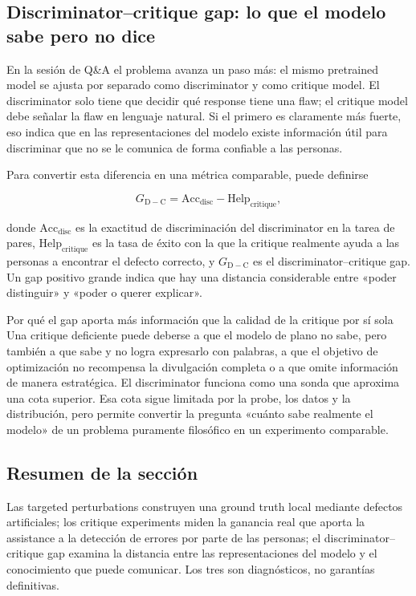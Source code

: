 \documentclass[a4paper]{article}
\begin{document}
\subsection{Discriminator--critique gap: lo que el modelo sabe pero no dice}

En la sesión de Q\&A el problema avanza un paso más: el mismo pretrained model se ajusta por separado como discriminator y como critique model. El discriminator solo tiene que decidir qué response tiene una flaw; el critique model debe señalar la flaw en lenguaje natural. Si el primero es claramente más fuerte, eso indica que en las representaciones del modelo existe información útil para discriminar que no se le comunica de forma confiable a las personas.

Para convertir esta diferencia en una métrica comparable, puede definirse

\[
G_{\mathrm{D-C}}=\mathrm{Acc}_{\mathrm{disc}}-\mathrm{Help}_{\mathrm{critique}},
\]

donde $\mathrm{Acc}_{\mathrm{disc}}$ es la exactitud de discriminación del discriminator en la tarea de pares, $\mathrm{Help}_{\mathrm{critique}}$ es la tasa de éxito con la que la critique realmente ayuda a las personas a encontrar el defecto correcto, y $G_{\mathrm{D-C}}$ es el discriminator--critique gap. Un gap positivo grande indica que hay una distancia considerable entre «poder distinguir» y «poder o querer explicar».

\begin{importantbox}{Por qué el gap aporta más información que la calidad de la critique por sí sola}
Una critique deficiente puede deberse a que el modelo de plano no sabe, pero también a que sabe y no logra expresarlo con palabras, a que el objetivo de optimización no recompensa la divulgación completa o a que omite información de manera estratégica. El discriminator funciona como una sonda que aproxima una cota superior. Esa cota sigue limitada por la probe, los datos y la distribución, pero permite convertir la pregunta «cuánto sabe realmente el modelo» de un problema puramente filosófico en un experimento comparable.
\end{importantbox}

\subsection{Resumen de la sección}

Las targeted perturbations construyen una ground truth local mediante defectos artificiales; los critique experiments miden la ganancia real que aporta la assistance a la detección de errores por parte de las personas; el discriminator--critique gap examina la distancia entre las representaciones del modelo y el conocimiento que puede comunicar. Los tres son diagnósticos, no garantías definitivas.
\end{document}
